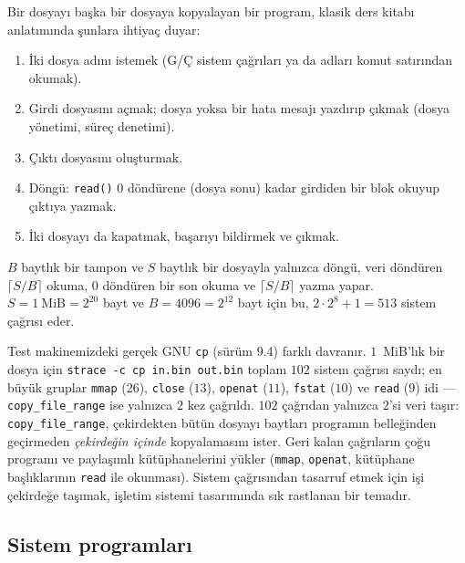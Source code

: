 \documentclass[11pt,a4paper]{article}
\newcommand{\cmd}[1]{\texttt{#1}}
\begin{document}
\begin{example}
Bir dosyayı başka bir dosyaya kopyalayan bir program, klasik ders kitabı anlatımında şunlara ihtiyaç duyar:
\begin{enumerate}[leftmargin=1.4em]
  \item İki dosya adını istemek (G/Ç sistem çağrıları ya da adları komut satırından okumak).
  \item Girdi dosyasını açmak; dosya yoksa bir hata mesajı yazdırıp çıkmak (dosya yönetimi, süreç denetimi).
  \item Çıktı dosyasını oluşturmak.
  \item Döngü: \cmd{read()} $0$ döndürene (dosya sonu) kadar girdiden bir blok okuyup çıktıya yazmak.
  \item İki dosyayı da kapatmak, başarıyı bildirmek ve çıkmak.
\end{enumerate}
$B$ baytlık bir tampon ve $S$ baytlık bir dosyayla yalnızca döngü, veri döndüren $\lceil S/B \rceil$ okuma, $0$ döndüren bir son okuma ve $\lceil S/B \rceil$ yazma yapar. $S = 1\ \text{MiB} = 2^{20}$ bayt ve $B = 4096 = 2^{12}$ bayt için bu, $2\cdot 2^{8} + 1 = 513$ sistem çağrısı eder.

Test makinemizdeki gerçek GNU \cmd{cp} (sürüm 9.4) farklı davranır. $1$~MiB'lık bir dosya için \cmd{strace -c cp in.bin out.bin} toplam $102$ sistem çağrısı saydı; en büyük gruplar \cmd{mmap} ($26$), \cmd{close} ($13$), \cmd{openat} ($11$), \cmd{fstat} ($10$) ve \cmd{read} ($9$) idi --- \cmd{copy\_file\_range} ise yalnızca $2$ kez çağrıldı.
$102$ çağrıdan yalnızca $2$'si veri taşır: \cmd{copy\_file\_range}, çekirdekten bütün dosyayı baytları programın belleğinden geçirmeden \emph{çekirdeğin içinde} kopyalamasını ister. Geri kalan çağrıların çoğu programı ve paylaşımlı kütüphanelerini yükler (\cmd{mmap}, \cmd{openat}, kütüphane başlıklarının \cmd{read} ile okunması). Sistem çağrısından tasarruf etmek için işi çekirdeğe taşımak, işletim sistemi tasarımında sık rastlanan bir temadır.
\end{example}

\subsection{Sistem programları}
\end{document}
